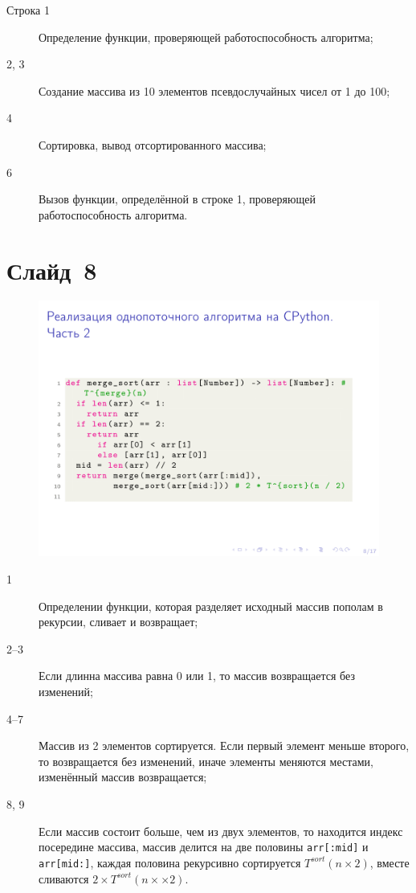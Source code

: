 \documentclass[aps,pre,reprint]{revtex4-2}
\begin{document}
	\begin{description}
		\item[Строка 1] Определение функции, проверяющей работоспособность алгоритма;
		\item[2, 3] Создание массива из 10 элементов псевдослучайных чисел от 1 до 100;
		\item[4] Сортировка, вывод отсортированного массива;
		\item[6] Вызов функции, определённой в строке 1, проверяющей работоспособность алгоритма.
	\end{description}

	\section{Слайд~8}
	\begin{figure}[H]
		\includegraphics[scale=.7]{presentation-08.png}
	\end{figure}
	
	\begin{description}
		\item[1] Определении функции, которая разделяет исходный массив пополам в рекурсии, сливает и возвращает;
		\item[2--3] Если длинна массива равна 0 или 1, то массив возвращается без изменений;
		\item[4--7] Массив из 2 элементов сортируется. Если первый элемент меньше второго, то возвращается без изменений, иначе элементы меняются местами, изменённый массив возвращается;
		\item[8, 9] Если массив состоит больше, чем из двух элементов, то находится индекс посередине массива, массив делится на две половины \verb*|arr[:mid]| и \verb*|arr[mid:]|, каждая половина рекурсивно сортируется $T^{sort}(n \times 2)$, вместе сливаются $2 \times T^{sort}(n \times \times 2)$.
	\end{description}
\end{document}
